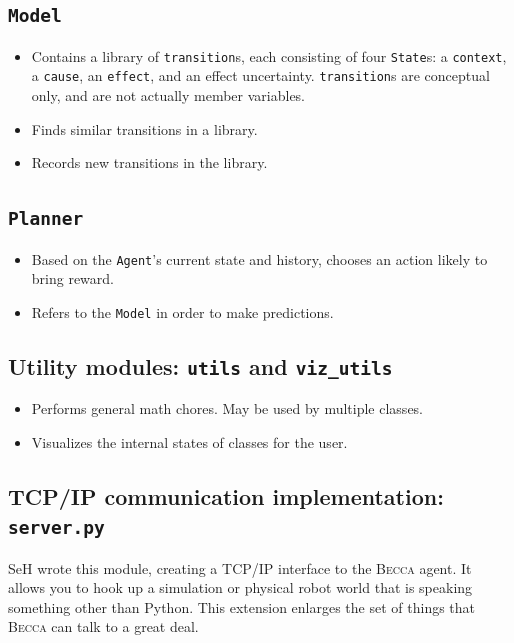 \subsection{\texttt{Model}}
\begin{itemize}
\item Contains a library of \texttt{transition}s, each consisting of four \texttt{State}s: a \texttt{context}, a \texttt{cause}, an \texttt{effect}, and an effect uncertainty. \texttt{transition}s are conceptual only, and are not actually member variables.
\item Finds similar transitions in a library.
\item Records new transitions in the library.
\end{itemize}

\subsection{\texttt{Planner}}
\begin{itemize}
\item Based on the \texttt{Agent}'s current state and history, chooses an action likely to bring reward.
\item Refers to the \texttt{Model} in order to make predictions.
\end{itemize}

\subsection{Utility modules: \texttt{utils} and \texttt{viz\_utils}}
\begin{itemize}
\item Performs general math chores. May be used by multiple classes.
\item Visualizes the internal states of classes for the user.
\end{itemize}

\subsection{TCP/IP communication implementation: \texttt{server.py}}
SeH wrote this module, creating a TCP/IP interface to the \textsc{Becca} agent. It allows you to hook up a simulation or physical robot world that is speaking something other than Python. This extension enlarges the set of things that \textsc{Becca} can talk to a great deal.

